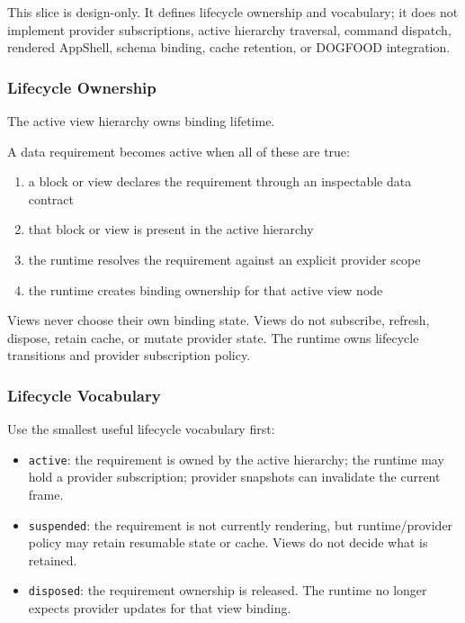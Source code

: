 This slice is design-only. It defines lifecycle ownership and vocabulary; it does not implement provider subscriptions, active hierarchy traversal, command dispatch, rendered AppShell, schema binding, cache retention, or DOGFOOD integration.

\subsubsection{Lifecycle Ownership}\label{record-132-lifecycle-ownership}

The active view hierarchy owns binding lifetime.

A data requirement becomes active when all of these are true:

\begin{enumerate}
\def\labelenumi{\arabic{enumi}.}
\tightlist
\item
  a block or view declares the requirement through an inspectable data contract
\item
  that block or view is present in the active hierarchy
\item
  the runtime resolves the requirement against an explicit provider scope
\item
  the runtime creates binding ownership for that active view node
\end{enumerate}

Views never choose their own binding state. Views do not subscribe, refresh, dispose, retain cache, or mutate provider state. The runtime owns lifecycle transitions and provider subscription policy.

\subsubsection{Lifecycle Vocabulary}\label{record-132-lifecycle-vocabulary}

Use the smallest useful lifecycle vocabulary first:

\begin{itemize}
\tightlist
\item
  \texttt{a\allowbreak{}c\allowbreak{}t\allowbreak{}i\allowbreak{}v\allowbreak{}e}: the requirement is owned by the active hierarchy; the runtime may hold a provider subscription; provider snapshots can invalidate the current frame.
\item
  \texttt{s\allowbreak{}u\allowbreak{}s\allowbreak{}p\allowbreak{}e\allowbreak{}n\allowbreak{}d\allowbreak{}e\allowbreak{}d}: the requirement is not currently rendering, but runtime/provider policy may retain resumable state or cache. Views do not decide what is retained.
\item
  \texttt{d\allowbreak{}i\allowbreak{}s\allowbreak{}p\allowbreak{}o\allowbreak{}s\allowbreak{}e\allowbreak{}d}: the requirement ownership is released. The runtime no longer expects provider updates for that view binding.
\end{itemize}

